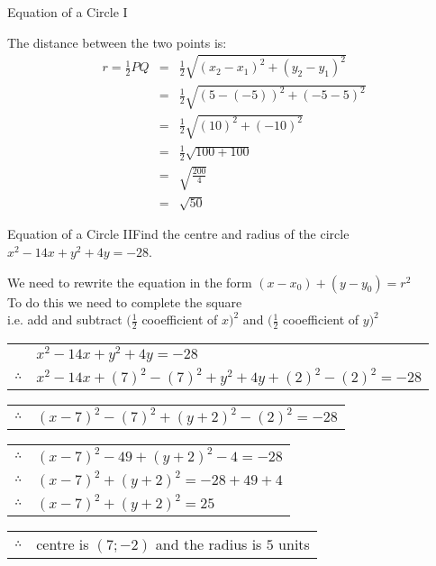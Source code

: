 \begin{wex}{Equation of a Circle I}
{The distance between the two points is:
\begin{eqnarray*}
r=\frac{1}{2}PQ &=& \frac{1}{2}\sqrt{(x_2-x_1)^2+(y_2-y_1)^2}\\
&=& \frac{1}{2}\sqrt{(5-(-5))^2+(-5-5)^2}\\
&=& \frac{1}{2}\sqrt{(10)^2+(-10)^2}\\
&=& \frac{1}{2}\sqrt{100+100}\\
&=& \sqrt{\frac{200}{4}}\\
&=& \sqrt{50}
\end{eqnarray*}

}
\end{wex}

\begin{wex}{Equation of a Circle II}{Find the centre and radius of the circle \\ $x^2 - 14 x + y^2 + 4y = -28$.}{
We need to rewrite the equation in the form  $(x - x_0) + (y - y_0) = r^2$ \\
To do this we need to complete the square \\
i.e. add and subtract $(\frac{1}{2}$ cooefficient of $x)^2$ and $(\frac{1}{2}$ cooefficient of $y)^2$ \\

\begin{tabular}{ll}
& $x^2 - 14 x + y^2 + 4y = -28$ \\
$\therefore$ & $x^2 - 14 x + (7)^2 -(7)^2 + y^2 + 4y + (2)^2 -(2)^2 = -28$ \\
\end{tabular}

\begin{tabular}{ll}
$\therefore$ & $(x - 7)^2 -(7)^2 + (y + 2)^2 -(2)^2 = -28$ \\
\end{tabular}

\begin{tabular}{ll}
$\therefore$ & $(x - 7)^2 -49 + (y + 2)^2 -4 = -28$ \\
$\therefore$ & $(x - 7)^2 + (y + 2)^2 = -28 + 49 + 4$ \\ 
$\therefore$ & $(x - 7)^2 + (y + 2)^2 = 25$ \\
\end{tabular}

\begin{tabular}{ll}
$\therefore$ & centre is $ (7;-2)$ and the radius is $5$ units
\end{tabular}
}
\end{wex}

